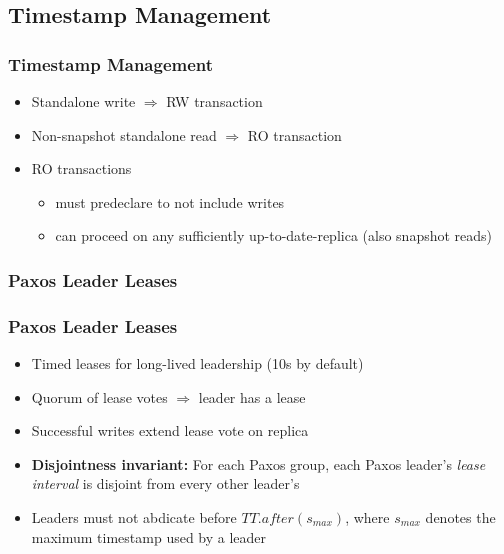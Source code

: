 \documentclass{beamer}
\begin{document}
\subsection{Timestamp Management}
\begin{frame}
  \frametitle{Timestamp Management}
  \begin{itemize}
    \item{Standalone write $\Rightarrow$ RW transaction}
    \item{Non-snapshot standalone read $\Rightarrow$ RO transaction}
    \item{RO transactions}
    \begin{itemize}
      \item{must predeclare to not include writes}
      \item{can proceed on any sufficiently up-to-date-replica (also snapshot reads)}
    \end{itemize}
  \end{itemize}
\end{frame}

\subsubsection{Paxos Leader Leases}
\begin{frame}
  \frametitle{Paxos Leader Leases}
  \begin{itemize}
    \item{Timed leases for long-lived leadership (10s by default)}
    \item{Quorum of lease votes $\Rightarrow$ leader has a lease}
    \item{Successful writes extend lease vote on replica}
    \item{\textbf{Disjointness invariant:} \newline
      For each Paxos group, each Paxos leader's \emph{lease interval} is disjoint
      from every other leader's
    }
    \item{Leaders must not abdicate before $TT.after(s_{max})$, where $s_{max}$
      denotes the maximum timestamp used by a leader
    }
  \end{itemize}
\end{frame}
\end{document}
